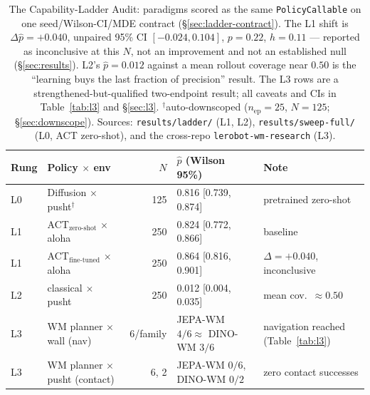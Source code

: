 \documentclass[10pt]{article}
\begin{document}
\begin{table}[t]
\centering
\small
\begin{tabular}{llrll}
\toprule
Rung & Policy $\times$ env & $N$ & $\hat{p}$ (Wilson 95\%) & Note \\
\midrule
L0 & Diffusion $\times$ pusht$^\dagger$ & 125 & 0.816 [0.739, 0.874] & pretrained zero-shot \\
L1 & ACT$_\text{zero-shot}$ $\times$ aloha & 250 & 0.824 [0.772, 0.866] & baseline \\
L1 & ACT$_\text{fine-tuned}$ $\times$ aloha & 250 & 0.864 [0.816, 0.901] & $\Delta{=}{+}0.040$, inconclusive \\
L2 & classical $\times$ pusht & 250 & 0.012 [0.004, 0.035] & mean cov.\ ${\approx}0.50$ \\
\midrule
L3 & WM planner $\times$ wall (nav) & 6/family & JEPA-WM $4/6 \approx$ DINO-WM $3/6$ & navigation reached (Table~\ref{tab:l3}) \\
L3 & WM planner $\times$ pusht (contact) & 6, 2 & JEPA-WM $0/6$, DINO-WM $0/2$ & zero contact successes \\
\bottomrule
\end{tabular}
\caption{The Capability-Ladder Audit: paradigms scored as the same
\texttt{PolicyCallable} on one seed/Wilson-CI/MDE contract
(\S\ref{sec:ladder-contract}). The L1 shift is
$\Delta\hat{p}{=}{+}0.040$, unpaired 95\% CI $[-0.024, 0.104]$,
$p{=}0.22$, $h{=}0.11$ --- reported as inconclusive at this $N$, not an
improvement and not an established null (\S\ref{sec:results}).
L2's $\hat{p}{=}0.012$ against a mean rollout coverage near
$0.50$ is the ``learning buys the last fraction of precision'' result.
The L3 rows are a strengthened-but-qualified two-endpoint result; all
caveats and CIs in Table~\ref{tab:l3} and \S\ref{sec:l3}.
$^\dagger$auto-downscoped ($n_\text{ep}{=}25$, $N{=}125$;
\S\ref{sec:downscope}). Sources: \texttt{results/ladder/} (L1, L2),
\texttt{results/sweep-full/} (L0, ACT zero-shot), and the cross-repo
\texttt{lerobot-wm-research} (L3).}
\label{tab:ladder}
\end{table}
\end{document}
